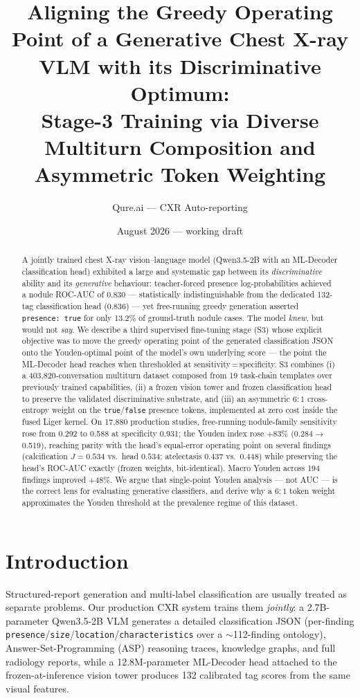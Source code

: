 \documentclass[10pt,a4paper]{article}
\title{\textbf{Aligning the Greedy Operating Point of a Generative Chest X-ray VLM
with its Discriminative Optimum:\\ Stage-3 Training via Diverse Multiturn Composition
and Asymmetric Token Weighting}}
\author{Qure.ai --- CXR Auto-reporting}
\date{August 2026 --- working draft}
\begin{document}
\maketitle

\begin{abstract}
A jointly trained chest X-ray vision--language model (Qwen3.5-2B with an ML-Decoder
classification head) exhibited a large and systematic gap between its
\emph{discriminative} ability and its \emph{generative} behaviour: teacher-forced
presence log-probabilities achieved a nodule ROC-AUC of 0.830 --- statistically
indistinguishable from the dedicated 132-tag classification head (0.836) --- yet
free-running greedy generation asserted \texttt{presence:\,true} for only 13.2\% of
ground-truth nodule cases. The model \emph{knew}, but would not \emph{say}. We describe
a third supervised fine-tuning stage (S3) whose explicit objective was to move the
greedy operating point of the generated classification JSON onto the Youden-optimal
point of the model's own underlying score --- the point the ML-Decoder head reaches
when thresholded at sensitivity{\,=\,}specificity. S3 combines (i) a 403{,}820-conversation
multiturn dataset composed from 19 task-chain templates over previously trained
capabilities, (ii) a frozen vision tower and frozen classification head to preserve the
validated discriminative substrate, and (iii) an asymmetric $6{:}1$ cross-entropy weight
on the \texttt{true}/\texttt{false} presence tokens, implemented at zero cost inside the
fused Liger kernel. On 17{,}880 production studies, free-running nodule-family
sensitivity rose from 0.292 to 0.588 at specificity 0.931; the Youden index rose
$+83\%$ (0.284$\to$0.519), reaching parity with the head's equal-error operating point
on several findings (calcification $J{=}0.534$ vs.\ head $0.534$; atelectasis 0.437
vs.\ 0.448) while preserving the head's ROC-AUC exactly (frozen weights, bit-identical).
Macro Youden across 194 findings improved $+48\%$. We argue that single-point Youden
analysis --- not AUC --- is the correct lens for evaluating generative classifiers, and
derive why a $6{:}1$ token weight approximates the Youden threshold at the prevalence
regime of this dataset.
\end{abstract}

\section{Introduction}

Structured-report generation and multi-label classification are usually treated as
separate problems. Our production CXR system trains them \emph{jointly}: a 2.7B-parameter
Qwen3.5-2B VLM generates a detailed classification JSON (per-finding
\texttt{presence}/\texttt{size}/\texttt{location}/\texttt{characteristics} over a
$\sim$112-finding ontology), Answer-Set-Programming (ASP) reasoning traces, knowledge
graphs, and full radiology reports, while a 12.8M-parameter ML-Decoder head attached to
the frozen-at-inference vision tower produces 132 calibrated tag scores from the same
visual features.
\end{document}
